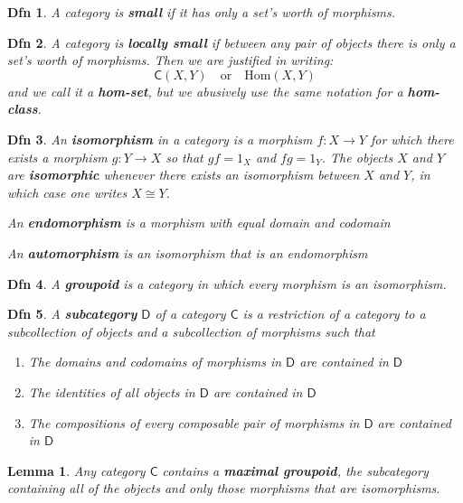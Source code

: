 \documentclass{article}
\theoremstyle{spacious}
\newtheorem*{dfn}{Dfn}
\newtheorem*{lem}{Lemma}
\renewcommand{\:}{\vcentcolon=} %
\begin{document}
\begin{dfn} A category is \textbf{small} if it has only a set's worth of morphisms.
\end{dfn}

\begin{dfn} A category is \textbf{locally small} if between any pair of objects there is only a set's worth of morphisms.  Then we \textit{are justified} in writing:
\[
    \mathsf{C}(X,Y) \quad \text{or} \quad \mathrm{Hom}\left(X,Y\right)
\]
and we call it a \textbf{hom-set}, but we \textit{abusively} use the same notation for a \textbf{hom-class}.
\end{dfn}

\begin{dfn} An \textbf{isomorphism} in a category is a morphism \(f:X\to Y\) for which there exists a morphism \(g:Y\to X\) so that \(gf=1_X\) and $fg=1_Y$.  The objects \(X\) and \(Y\) are \textbf{isomorphic} whenever there exists an isomorphism between \(X\) and \(Y\), in which case one writes \(X \cong Y\).

An \textbf{endomorphism} is  a morphism with equal domain and codomain

An \textbf{automorphism} is an isomorphism that is an endomorphism

\end{dfn}

\begin{dfn} A \textbf{groupoid} is a category in which every morphism is an isomorphism.
\end{dfn}

\begin{dfn} A \textbf{subcategory} \(\mathsf{D}\) of a category \(\mathsf{C}\) is a restriction of a category to a subcollection of objects and a subcollection of morphisms such that 
    \begin{enumerate}
        \item The domains and codomains of morphisms in \(\mathsf{D}\) are contained in \(\mathsf{D}\)
        \item The identities of all objects in \(\mathsf{D}\) are contained in \(\mathsf{D}\)
        \item The compositions of every composable pair of morphisms in \(\mathsf{D}\) are contained in \(\mathsf{D}\)
    \end{enumerate}
\end{dfn}

\begin{lem} Any category $\mathsf{C}$ contains a \textbf{maximal groupoid}, the subcategory containing all of the objects and only those morphisms that are isomorphisms.    
\end{lem}
\end{document}
